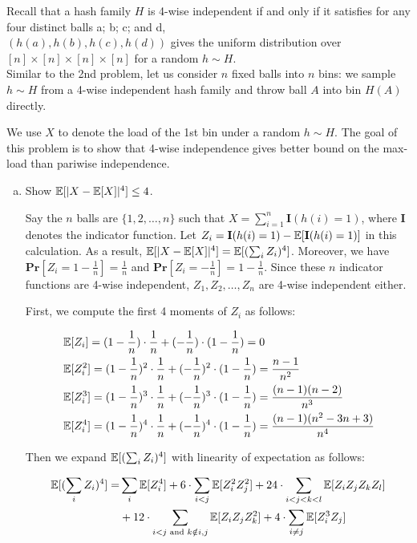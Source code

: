 \begin{problem}[30 points]
Recall that a hash family $H$ is 4-wise independent if and only if it satisfies for any four distinct balls a; b; c; and d, \\
$(h(a), h(b), h(c), h(d))$ gives the uniform distribution over $[n] \times [n] \times [n] \times [n]$ for a random $h \sim H$. \\
Similar to the 2nd problem, let us consider $n$ fixed balls into $n$ bins: we sample $h \sim H$ from a 4-wise independent hash family and throw ball $A$ into bin $H(A)$ directly.

We use $X$ to denote the load of the 1st bin under a random $h \sim H$. The goal of this problem is to show that 4-wise independence gives better bound on the max-load than pariwise independence.

\begin{enumerate}[(a)]
\item Show $\operatorname*{\mathbb{E}}[|X - \operatorname*{\mathbb{E}}[X]|^4] \le 4$.

\Answer
Say the $n$ balls are $\{1,2, \dots, n\}$ such that $X=\sum_{i=1}^n \mathbf{I}(h(i)=1)$, where $\mathbf{I}$ denotes the indicator function. Let $Z_i = \mathbf{I}(h(i)=1)-\operatorname*{\mathbb{E}}[\mathbf{I}(h(i)=1)]$ in this calculation. As a result, $\operatorname*{\mathbb{E}}[|X - \operatorname*{\mathbb{E}}[X]|^4]=\operatorname*{\mathbb{E}}[(\sum_i Z_i)^4]$. Moreover, we have $\mathbf{Pr}[Z_i = 1 - \frac{1}{n}] = \frac{1}{n}$ and $\mathbf{Pr}[Z_i = -\frac{1}{n}] = 1 - \frac{1}{n}$. Since these $n$ indicator functions are 4-wise independent, $Z_1, Z_2, \dots, Z_n$ are 4-wise independent either.

First, we compute the first 4 moments of $Z_i$ as follows:

\begin{align}
& \operatorname*{\mathbb{E}}[Z_i] = (1 - \frac{1}{n}) \cdot \frac{1}{n} + (-\frac{1}{n}) \cdot (1 - \frac{1}{n}) = 0 \notag \\
& \operatorname*{\mathbb{E}}[Z_i^2] = (1 - \frac{1}{n})^2 \cdot \frac{1}{n} + (-\frac{1}{n})^2 \cdot (1 - \frac{1}{n}) = \frac{n-1}{n^2} \notag \\
& \operatorname*{\mathbb{E}}[Z_i^3] = (1 - \frac{1}{n})^3 \cdot \frac{1}{n} + (-\frac{1}{n})^3 \cdot (1 - \frac{1}{n}) = \frac{(n-1)(n-2)}{n^3} \notag \\
& \operatorname*{\mathbb{E}}[Z_i^4] = (1 - \frac{1}{n})^4 \cdot \frac{1}{n} + (-\frac{1}{n})^4 \cdot (1 - \frac{1}{n}) = \frac{(n-1)(n^2-3n+3)}{n^4} \notag
\end{align}

Then we expand $\operatorname*{\mathbb{E}}[(\sum_{i}{Z_i})^4]$ with linearity of expectation as follows:

\begin{align} \label{eq:3}
\operatorname*{\mathbb{E}}[(\sum_{i}{Z_i})^4] = & \sum_{i}{\operatorname*{\mathbb{E}}[Z_i^4]} + 6 \cdot \sum_{i<j}{\operatorname*{\mathbb{E}}[Z_i^2 Z_j^2]} + 24 \cdot \sum_{i<j<k<l}{\operatorname*{\mathbb{E}}[Z_i Z_j Z_k Z_l]} \notag \\
& + 12 \cdot \sum_{i<j \text{ and } k \notin {i,j}}{\operatorname*{\mathbb{E}}[Z_i Z_j Z_k^2]} + 4 \cdot \sum_{i \neq j}{\operatorname*{\mathbb{E}}[Z_i^3 Z_j]}
\end{align}


\end{enumerate}
\end{problem}
